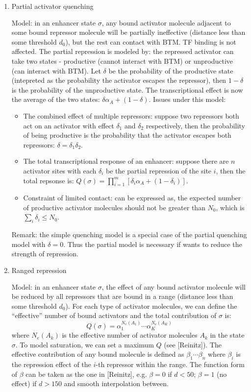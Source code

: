 \documentclass[11pt]{article}
\begin{document}
\begin{enumerate}
\begin{enumerate}
\item{Partial activator quenching}

Model: in an enhancer state $\sigma$, any bound activator molecule adjacent to some bound repressor molecule will be partially ineffective (distance less than some threshold $d_0$), but the rest can contact with BTM. TF binding is not affected. The partial repression is modeled by: the repressed activator can take two states - productive (cannot interact with BTM) or unproductive (can interact with BTM). Let $\delta$ be the probability of the productive state (intepreted as the probability the activator escapes the repressor), then $1 - \delta$ is the probability of the unproductive state. The transcriptional effect is now the average of the two states: $\delta \alpha_A + (1-\delta)$. Issues under this model:
\begin{itemize}
\item The combined effect of multiple repressors: suppose two repressors both act on an activator with effect $\delta_1$ and $\delta_2$ respectively, then the probability of being productive is the probability that the activator escapes both repressors: $\delta = \delta_1 \delta_2$. 
\item The total transcriptional response of an enhancer: suppose there are $n$ activator sites with each $\delta_i$ be the partial repression of the site $i$, then the total repsonse is: $Q(\sigma) = \prod_{i=1}^m [\delta_i \alpha_A + (1-\delta_i)]$. 
\item Constraint of limited contact: can be expressed as, the expected number of productive activator molecules should not be greater than $N_0$, which is $\sum_i \delta_i \leq N_0$. 
\end{itemize}

Remark: the simple quenching model is a special case of the partial quenching model with $\delta = 0$. Thus the partial model is necessary if wants to reduce the strength of repression. 

\item{Ranged repression}

Model: in an enhancer state $\sigma$, the effect of any bound activator molecule will be reduced by all repressors that are bound in a range (distance less than some threshold $d_0$). For each type of activator molecules, we can define the ``effective'' number of bound activators and the total contribution of $\sigma$ is: 
\begin{equation}
Q(\sigma) = \alpha_1^{N_e(A_1)} \cdots \alpha_K^{N_e(A_K)}
\end{equation}
where $N_e(A_k)$ is the effective number of activator molecules $A_k$ in the state $\sigma$. To model saturation, we can set a maximum $Q$ (see [Reinitz]). The effective contribution of any bound molecule is defined as $\beta_1 \cdots \beta_n$ where $\beta_i$ is the repression effect of the $i$-th repressor within the range. The function form of $\beta$ can be taken as the one in [Reinitz], e.g. $\beta = 0$ if $d < 50$; $\beta = 1$ (no effect) if $d > 150$ and smooth interpolation between. 


\end{enumerate}
\end{enumerate}
\end{document}
